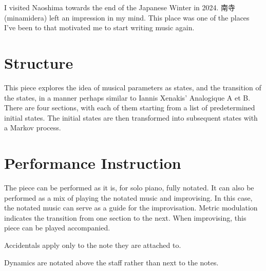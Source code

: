 \documentclass{article}
\begin{document}
I visited Naoshima towards the end of the Japanese Winter in 2024. 南寺
(minamidera) left an impression in my mind. This place was one of the
places I've been to that motivated me to start writing music again.

\section*{Structure}
This piece explores the idea of musical parameters as states, and the
transition of the states, in a manner perhaps similar to Iannis Xenakis'
Analogique A et B. There are four sections, with each of them starting
from a list of predetermined initial states. The initial states are then
transformed into subsequent states with a Markov process.

\section*{Performance Instruction}
The piece can be performed as it is, for solo piano, fully notated.
%
It can also be performed as a mix of playing the notated music and
improvising.
%
In this case, the notated music can serve as a guide for the
improvisation.
%
Metric modulation indicates the transition from one section to the next.
%
When improvising, this piece can be played accompanied.

\noindent
Accidentals apply only to the note they are attached to.

\noindent
Dynamics are notated above the staff rather than next to the notes.
\end{document}
